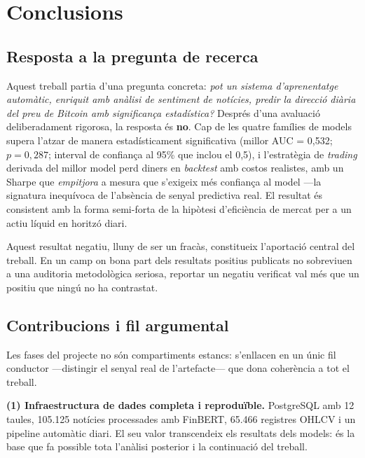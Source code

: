 \documentclass[12pt, a4paper]{report}
\begin{document}
\chapter{Conclusions}

\section{Resposta a la pregunta de recerca}

Aquest treball partia d'una pregunta concreta: \emph{pot un sistema d'aprenentatge automàtic, enriquit amb anàlisi de sentiment de notícies, predir la direcció diària del preu de Bitcoin amb significança estadística?} Després d'una avaluació deliberadament rigorosa, la resposta és \textbf{no}. Cap de les quatre famílies de models supera l'atzar de manera estadísticament significativa (millor AUC = 0,532; $p = 0{,}287$; interval de confiança al 95\% que inclou el 0,5), i l'estratègia de \textit{trading} derivada del millor model perd diners en \textit{backtest} amb costos realistes, amb un Sharpe que \emph{empitjora} a mesura que s'exigeix més confiança al model ---la signatura inequívoca de l'absència de senyal predictiva real. El resultat és consistent amb la forma semi-forta de la hipòtesi d'eficiència de mercat per a un actiu líquid en horitzó diari.

Aquest resultat negatiu, lluny de ser un fracàs, constitueix l'aportació central del treball. En un camp on bona part dels resultats positius publicats no sobreviuen a una auditoria metodològica seriosa, reportar un negatiu verificat val més que un positiu que ningú no ha contrastat.

\section{Contribucions i fil argumental}

Les fases del projecte no són compartiments estancs: s'enllacen en un únic fil conductor ---distingir el senyal real de l'artefacte--- que dona coherència a tot el treball.

\textbf{(1) Infraestructura de dades completa i reproduïble.} PostgreSQL amb 12 taules, 105.125 notícies processades amb FinBERT, 65.466 registres OHLCV i un pipeline automàtic diari. El seu valor transcendeix els resultats dels models: és la base que fa possible tota l'anàlisi posterior i la continuació del treball.
\end{document}

